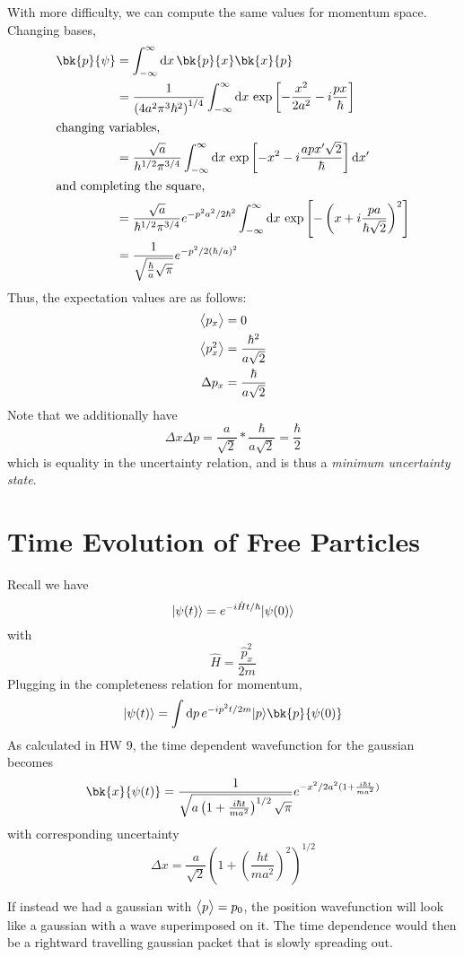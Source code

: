 With more difficulty, we can compute the same values for momentum space. Changing bases,
\begin{align*}
	\bk{p}{\p}&=\int_{-\infty}^\infty\d{x}\bk{p}{x}\bk{x}{p}\\
		  &=\frac{1}{\left(4a^2\pi^3\hbar^2\right)^{1/4}}\int_{-\infty}^\infty\d{x}\exp\left[-\frac{x^2}{2a^2}-i\frac{px}{\hbar}\right]\\
		  \intertext{changing variables,}
		  &=\frac{\sqrt{a}}{h^{1/2}\pi^{3/4}}\int_{-\infty}^\infty\d{x}\exp\left[-x^2-i\frac{apx'\sqrt{2}}{\hbar}\right]\d{x'}\\
		  \intertext{and completing the square,}
		  &=\frac{\sqrt{a}}{\hbar^{1/2}\pi^{3/4}}e^{-p^2a^2/2\hbar^2}\int_{-\infty}^\infty\d{x}\exp\left[-\left(x+i\frac{pa}{\hbar\sqrt{2}}\right)^2\right]\\
		  &=\frac{1}{\sqrt{\frac{\hbar}{a}\sqrt{\pi}}}e^{-p^2/2(\hbar/a)^2}
\end{align*}
Thus, the expectation values are as follows:
\begin{align*}
	\left\langle \begin{matrix}p_x\end{matrix} \right\rangle&=0\\
	\left\langle \begin{matrix}p_x^2\end{matrix} \right\rangle&=\frac{\hbar^2}{a\sqrt{2}}\\
	\Delta p_x &= \frac{\hbar}{a\sqrt{2}}
\end{align*}
Note that we additionally have
\[\Delta x \Delta p = \frac{a}{\sqrt{2}}*\frac{\hbar}{a\sqrt{2}} = \frac{\hbar}{2}\]
which is equality in the uncertainty relation, and is thus a \emph{minimum uncertainty state}.

\section{Time Evolution of Free Particles}
Recall we have
\[\lvert\psi(t)\rangle=e^{-i\hat H t/\hbar}\lvert\psi(0)\rangle\]
with 
\[\hat H = \frac{\hat p_x^2}{2m}\]
Plugging in the completeness relation for momentum,
\[\k{\p(t)}=\int\d{p}e^{-i p^2 t/2m}\k{p}\bk{p}{\p(0)}\]
As calculated in HW 9, the time dependent wavefunction for the gaussian becomes
\begin{equation}
	\bk{x}{\p(t)} = \frac{1}{\sqrt{a\left(1+\frac{i\hbar t}{ma^2}\right)^{1/2}\sqrt{\pi}}}e^{-x^2/2a^2(1+\frac{i\hbar t}{ma^2})}
\end{equation}
with corresponding uncertainty
\begin{equation}
	\Delta x = \frac{a}{\sqrt{2}}\left(1+\left(\frac{ht}{ma^2}\right)^2\right)^{1/2}
\end{equation}

If instead we had a gaussian with \(\left\langle \begin{matrix}p\end{matrix} \right\rangle=p_0\), the position wavefunction will look like a gaussian with a wave superimposed on it. The time dependence would then be a rightward travelling gaussian packet that is slowly spreading out.

